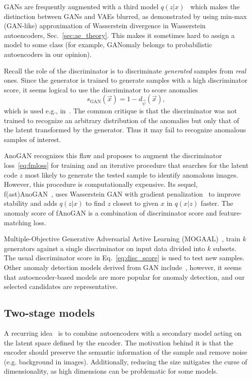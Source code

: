 GANs are frequently augmented with a third model $q(z|x)$~\cite{donahue2016adversarial} which makes the distinction between GANs and VAEs blurred, as demonstrated by using min-max (GAN-like) approximation of Wasserstein divergence in Wasserstein autoencoders, Sec.~\ref{sec:ae_theory}.  This makes it sometimes hard to assign a model to some class (for example, GANomaly belongs to probabilistic autoencoders in our opinion).

Recall the role of the discriminator is to discriminate \textit{generated} samples from \textit{real} ones. Since the generator is trained to generate samples with a high discriminator score, it seems logical to use the discriminator to score anomalies
\begin{equation}
     s_{\text{GAN}}(\vec{x}) = 1 - d_{\vec{\psi}}(\vec{x}),
     \label{eq:disc_score}
\end{equation}
which is used e.g., in~\cite{liu2019generative}. The common critique is that the discriminator was not trained to recognize an arbitrary distribution of the anomalies but only that of the latent transformed by the generator. Thus it may fail to recognize anomalous samples of interest. 

AnoGAN recognizes this flaw and proposes to augment the discriminator loss~\eqref{eq:fmloss} for training and an iterative procedure that searches for the latent code $z$ most likely to generate the tested sample to identify anomalous images. However, this procedure is computationally expensive. Its sequel, f(ast)AnoGAN~\cite{schleglFAnoGANFastUnsupervised2019}, uses Wasserstein GAN with gradient penalization~\cite{gulrajani2017improved} to improve stability and adds $q(z|x)$ to find $z$ closest to given $x$ in $q(x|z)$ faster. The anomaly score of fAnoGAN is a combination of discriminator score and feature-matching loss.

Multiple-Objective Generative Adversarial Active Learning (MOGAAL)~\cite{liu2019generative}, train $k$ generators against a single discriminator on input data divided into $k$ subsets. The usual discriminator score in Eq.~\eqref{eq:disc_score} is used to test new samples.
Other anomaly detection models derived from GAN include~\cite{zenatiEfficientGANBasedAnomaly2018, kliger2018novelty, perera2019ocgan}, however, it seems that autoencoder-based models are more popular for anomaly detection, and our selected candidates are representative.

\subsection{Two-stage models}
A recurring idea~\cite{ergen2017unsupervised, yaoUnsupervisedAnomalyDetection2019, ruff2018deep, vskvara2020detection} is to combine autoencoders with a secondary model acting on the latent space defined by the encoder. The motivation behind it is that the encoder should preserve the semantic information of the sample and remove noise (e.g. background in images). Additionally, reducing the size mitigates the curse of dimensionality, as high dimensions can be problematic for some models.

